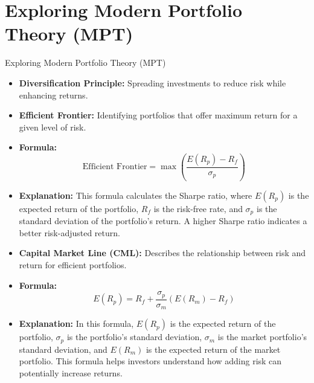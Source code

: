 \documentclass{beamer}
\begin{document}
\section{Exploring Modern Portfolio Theory (MPT)}
\begin{frame}{Exploring Modern Portfolio Theory (MPT)}
    \begin{itemize}
        \item \textbf{Diversification Principle:} Spreading investments to reduce risk while enhancing returns.
        \item \textbf{Efficient Frontier:} Identifying portfolios that offer maximum return for a given level of risk.
        \item \textbf{Formula:}
        \begin{equation*}
            \text{Efficient Frontier} = \max \left( \frac{E(R_p) - R_f}{\sigma_p} \right)
        \end{equation*}
        \item \textbf{Explanation:} This formula calculates the Sharpe ratio, where \( E(R_p) \) is the expected return of the portfolio, \( R_f \) is the risk-free rate, and \( \sigma_p \) is the standard deviation of the portfolio's return. A higher Sharpe ratio indicates a better risk-adjusted return.
        \item \textbf{Capital Market Line (CML):} Describes the relationship between risk and return for efficient portfolios.
        \item \textbf{Formula:}
        \begin{equation*}
            E(R_p) = R_f + \frac{\sigma_p}{\sigma_m} \left( E(R_m) - R_f \right)
        \end{equation*}
        \item \textbf{Explanation:} In this formula, \( E(R_p) \) is the expected return of the portfolio, \( \sigma_p \) is the portfolio's standard deviation, \( \sigma_m \) is the market portfolio's standard deviation, and \( E(R_m) \) is the expected return of the market portfolio. This formula helps investors understand how adding risk can potentially increase returns.
    \end{itemize}
\end{frame}
\end{document}
